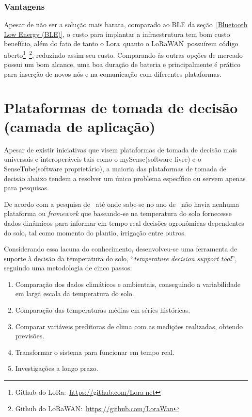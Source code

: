 \documentclass[
article,			%
12pt,				%
oneside,			%
a4paper,			%
english,			%
brazil,				%
sumario=tradicional
]{abntex2}
\begin{document}
\subsubsection{Vantagens}\label{Vantagens}
Apesar de não ser a solução mais barata, comparado ao BLE da seção~\ref{Bluetooth Low Energy (BLE)}, o custo para implantar a infraestrutura tem bom custo benefício\cite{siteLorawan}, além do fato de tanto o Lora\textregistered~quanto o LoRaWAN\texttrademark~possuírem código aberto\footnote{Github do LoRa:~\url{https://github.com/Lora-net}}~\footnote{Github do LoRaWAN:~\url{https://github.com/LoraWan}}, reduzindo assim seu custo. Comparando às outras opções de mercado possui um bom alcance, uma boa duração de bateria e principalmente é prático para inserção de novos nós e na comunicação com diferentes plataformas\cite{lorawan}.



\section{Plataformas de tomada de decisão (camada de aplicação)}\label{Plataformas de tomada de decisão}

Apesar de existir iniciativas que visem plataformas de tomada de decisão mais universais e interoperáveis tais como o mySense\cite{7}(software livre) e o SenseTube\cite{6}(software proprietário), a maioria das plataformas de tomada de decisão abaixo tendem a resolver um único problema específico ou servem apenas para pesquisas.





De acordo com a pesquisa de~\citeauthor{1} até onde sabe-se no ano de~\citeyear{1} não havia nenhuma plataforma ou \textit{framework} que baseando-se na temperatura do solo fornecesse dados dinâmicos para informar em tempo real decisões agronômicas dependentes do solo, tal como momento do plantio, irrigação entre outros.

Considerando essa lacuna do conhecimento, desenvolveu-se uma ferramenta de suporte à decisão da temperatura do solo, ``\textit{temperature decision support tool}'', seguindo uma metodologia de cinco passos:
\begin{enumerate}
  \item Comparação dos dados climáticos e ambientais, conseguindo a variabilidade em larga escala da temperatura do solo.

  \item Comparação das temperaturas médias em séries históricas.
  \item Comparar variáveis preditoras de clima com as medições realizadas, obtendo previsões.
  \item Transformar o sistema para funcionar em tempo real.
  \item Investigações a longo prazo.
\end{enumerate}
\end{document}
